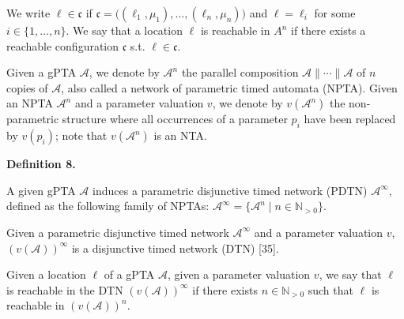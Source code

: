 \documentclass[10pt,a4paper]{article}
\begin{document}
 
 
We write $\mathrm{\ell}\in\mathfrak{c}$ if $\mathfrak{c}=\big((\mathrm{\ell}_{1},\mu_{1}),\ldots,(\mathrm{\ell}_{n},\mu_{n})\big)$ and $\mathrm{\ell}=\mathrm{\ell}_{i}$ for some $i\in\{1,\dots,n\}$. We say that a location $\mathrm{\ell}$ is reachable in ${{A}}^{n}$ if there exists a reachable configuration $\mathfrak{c}$ s.t. $\mathrm{\ell}\in\mathfrak{c}$.\par
 
 
 
Given a gPTA $\mathcal{A}$, we denote by ${\mathcal{A}}^{n}$ the parallel composition $\mathcal{A}\parallel\cdots\parallel\mathcal{A}$ of $n$ copies of $\mathcal{A}$, also called a network of parametric timed automata (NPTA). Given an NPTA ${\mathcal{A}}^{n}$ and a parameter valuation $v$, we denote by $v({\mathcal{A}}^{n})$ the non-parametric structure where all occurrences of a parameter $p_{i}$ have been replaced by $v(p_{i})$; note that $v({\mathcal{A}}^{n})$ is an NTA.\par
 
 
 
\par\medskip\noindent\textbf{Definition 8.}\par
 
 
A given gPTA $\mathcal{A}$ induces a parametric disjunctive timed network (PDTN) ${\mathcal{A}}^{\infty}$, defined as the following family of NPTAs: ${\mathcal{A}}^{\infty}=\{{\mathcal{A}}^{n}\mid n\in\mathbb{N}_{>0}\}$.\par
 
 
 
 
Given a parametric disjunctive timed network ${\mathcal{A}}^{\infty}$ and a parameter valuation $v$, ${(v(\mathcal{A}))}^{\infty}$ is a disjunctive timed network (DTN) [35].\par
 
 
 
Given a location $\mathrm{\ell}$ of a gPTA $\mathcal{A}$, given a parameter valuation $v$, we say that $\mathrm{\ell}$ is reachable in the DTN ${(v(\mathcal{A}))}^{\infty}$ if there exists $n\in\mathbb{N}_{>0}$ such that $\mathrm{\ell}$ is reachable in ${(v(\mathcal{A}))}^{n}$.\par
 
\end{document}
